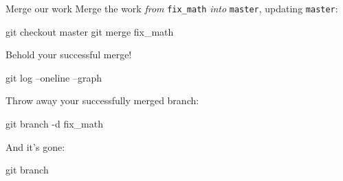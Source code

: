 \begin{frame}[fragile]{Merge our work}
  Merge the work \emph{from} \texttt{fix\_math} \emph{into} \texttt{master}, updating \texttt{master}:

  \begin{gitCommand}
git checkout master
git merge fix_math
  \end{gitCommand}

  Behold your successful merge!

  \begin{gitCommand}git log --oneline --graph\end{gitCommand}

  Throw away your successfully merged branch:

  \begin{gitCommand}git branch -d fix_math\end{gitCommand}

  And it's gone:

  \begin{gitCommand}git branch\end{gitCommand}

\end{frame}


